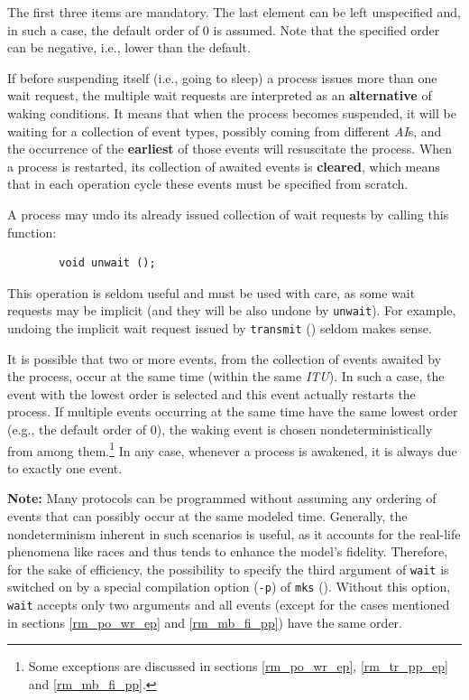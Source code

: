 The first three items are mandatory.
The last element can be left unspecified and, in such a case, the default order
of 0 is assumed.
Note that the specified order can be negative, i.e., lower than the
default.

If before suspending itself (i.e., going to sleep) a process issues more
than one wait request, the multiple wait requests are interpreted as an
{\bf alternative} of waking conditions.
It means that when the process becomes suspended, it will be waiting for
a collection of event types, possibly coming from different {\em AI\/}s,
and the occurrence of the 
{\bf earliest} of those events will resuscitate the process.
When a process is restarted, its collection of awaited events is {\bf cleared},
which means that in each operation cycle these events must be specified
from scratch.

A process may undo its already issued collection of wait requests by calling
this function:
\begin{verbatim}
        void unwait ();
\end{verbatim}
\noindent
This operation is seldom useful and must be used with care, as some wait
requests may be implicit (and they will be also undone by {\tt unwait}).
For example, undoing the implicit wait request issued by
{\tt transmit} () seldom makes sense.

It is possible that
two or more events, from the collection of events awaited by the process,
occur at the same time (within the same {\em ITU\/}).
In such a case, the event with the lowest order
is selected and this event actually restarts the process.
If multiple events occurring at the same time have the same
lowest order (e.g., the default order of 0),
the waking event is chosen nondeterministically from among them.\footnote{Some
exceptions are 
discussed in sections \ref{rm_po_wr_ep}, \ref{rm_tr_pp_ep} and \ref{rm_mb_fi_pp}.}
In any case,
whenever a process is awakened, it is always due to exactly one event.

\medskip

\noindent
{\bf Note:} Many protocols can be programmed without assuming any ordering
of events that can possibly occur at the same modeled time.
Generally, the nondeterminism inherent in such scenarios is useful, as it
accounts for the real-life phenomena like races and thus tends to
enhance the model's fidelity.
Therefore, for the sake of efficiency, the possibility to specify the
third argument of {\tt wait} is switched on by a special compilation option
({\tt -p}) of {\tt mks} ().
Without this option, {\tt wait} accepts only two arguments and all
events (except for the cases mentioned in
sections \ref{rm_po_wr_ep} and \ref{rm_mb_fi_pp}) have the same order.

